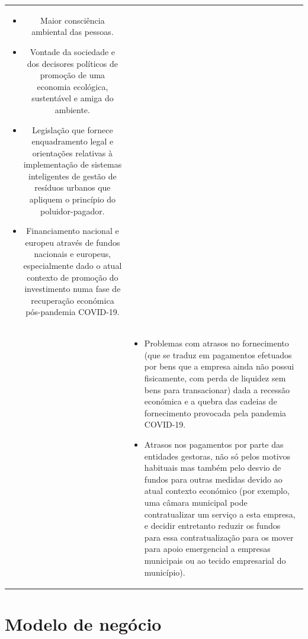 \documentclass[11pt, a4paper, oneside]{book}
\begin{document}
\begin{center}
\begin{tabular}{c l @{}}
\begin{minipage}{122mm}
\begin{itemize}
                \item Maior consciência ambiental das pessoas.
                \item Vontade da sociedade e dos decisores políticos de promoção de uma economia ecológica, sustentável e amiga do ambiente.
                \item Legislação que fornece enquadramento legal e orientações relativas à implementação de sistemas inteligentes de gestão de resíduos urbanos que apliquem o princípio do poluidor-pagador.
                \item Financiamento nacional e europeu através de fundos nacionais e europeus, especialmente dado o atual contexto de promoção do investimento numa fase de recuperação económica pós-pandemia COVID-19.
            \end{itemize}\vspace{0.0em}\end{minipage} \\
        \cellcolor{orange!80}\color{white}{\Large\textbf{Threats}} &
            \begin{minipage}{122mm}\vspace{0.4em}\begin{itemize}\itemsep0em
                \item Problemas com atrasos no fornecimento (que se traduz em pagamentos efetuados por bens que a empresa ainda não possui fisicamente, com perda de liquidez sem bens para transacionar) dada a recessão económica e a quebra das cadeias de fornecimento provocada pela pandemia COVID-19.
                \item Atrasos nos pagamentos por parte das entidades gestoras, não só pelos motivos habituais mas também pelo desvio de fundos para outras medidas devido ao atual contexto económico (por exemplo, uma câmara municipal pode contratualizar um serviço a esta empresa, e decidir entretanto reduzir os fundos para essa contratualização para os mover para apoio emergencial a empresas municipais ou ao tecido empresarial do município).
            \end{itemize}\vspace{0.0em}\end{minipage}
    \end{tabular}
\end{center}

\chapter{Modelo de negócio}
\end{document}
